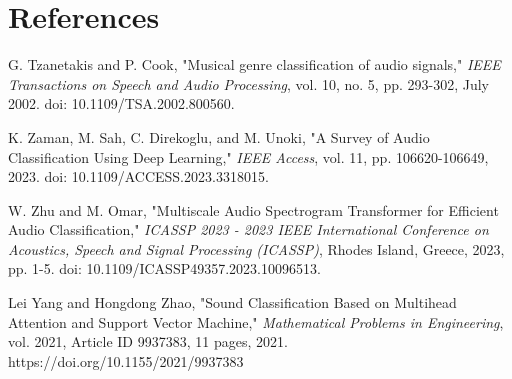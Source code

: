 \documentclass[lettersize,journal]{IEEEtran}
\begin{document}
\section{References}

\begingroup
\renewcommand{\section}[2]{}%
\begin{thebibliography}{9}

G. Tzanetakis and P. Cook,
"Musical genre classification of audio signals,"
\textit{IEEE Transactions on Speech and Audio Processing},
vol. 10, no. 5, pp. 293-302, July 2002.
doi: 10.1109/TSA.2002.800560.
\vspace{\baselineskip}

K. Zaman, M. Sah, C. Direkoglu, and M. Unoki,
"A Survey of Audio Classification Using Deep Learning,"
\textit{IEEE Access},
vol. 11, pp. 106620-106649, 2023.
doi: 10.1109/ACCESS.2023.3318015.
\vspace{\baselineskip}

W. Zhu and M. Omar,
"Multiscale Audio Spectrogram Transformer for Efficient Audio Classification,"
\textit{ICASSP 2023 - 2023 IEEE International Conference on Acoustics, Speech and Signal Processing (ICASSP)},
Rhodes Island, Greece, 2023, pp. 1-5.
doi: 10.1109/ICASSP49357.2023.10096513.
\vspace{\baselineskip}

Lei Yang and Hongdong Zhao,
"Sound Classification Based on Multihead Attention and Support Vector Machine,"
\textit{Mathematical Problems in Engineering},
vol. 2021, Article ID 9937383, 11 pages, 2021.
https://doi.org/10.1155/2021/9937383

\end{thebibliography}
\endgroup
\vfill
\end{document}
